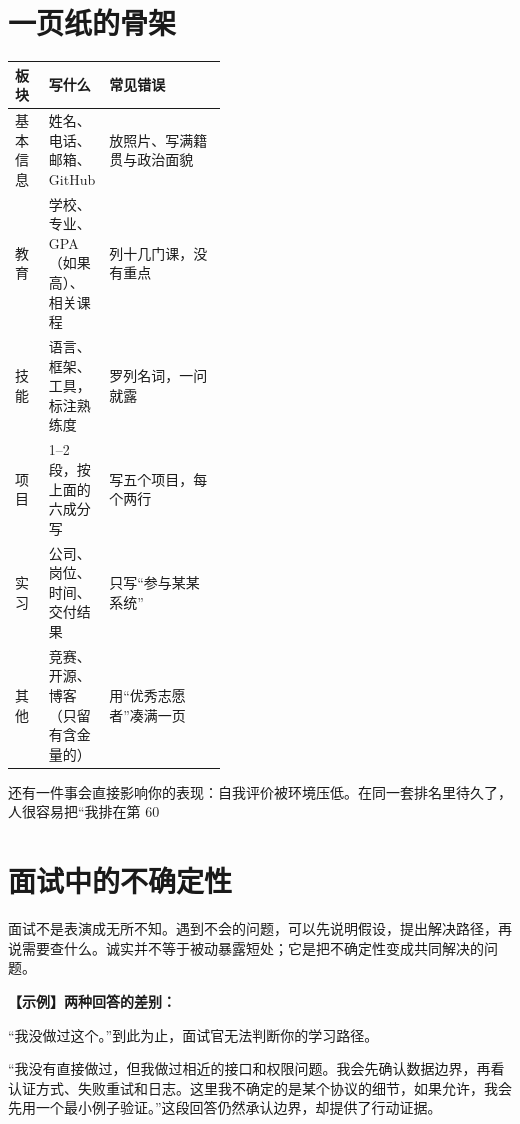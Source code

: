 \documentclass[UTF8,zihao=5,openany]{ctexbook}
\begin{document}
\section{一页纸的骨架}
\begin{center}\small
\begin{tabularx}{\linewidth}{p{0.16\linewidth}p{0.26\linewidth}Y}
\toprule
板块 & 写什么 & 常见错误 \\
\midrule
基本信息 & 姓名、电话、邮箱、GitHub & 放照片、写满籍贯与政治面貌 \\
教育 & 学校、专业、GPA（如果高）、相关课程 & 列十几门课，没有重点 \\
技能 & 语言、框架、工具，标注熟练度 & 罗列名词，一问就露 \\
项目 & 1--2 段，按上面的六成分写 & 写五个项目，每个两行 \\
实习 & 公司、岗位、时间、交付结果 & 只写“参与某某系统” \\
其他 & 竞赛、开源、博客（只留有含金量的） & 用“优秀志愿者”凑满一页 \\
\bottomrule
\end{tabularx}
\end{center}


还有一件事会直接影响你的表现：自我评价被环境压低。在同一套排名里待久了，人很容易把“我排在第 60%

\section{面试中的不确定性}
面试不是表演成无所不知。遇到不会的问题，可以先说明假设，提出解决路径，再说需要查什么。诚实并不等于被动暴露短处；它是把不确定性变成共同解决的问题。

\begin{casebox}
\textbf{【示例】两种回答的差别：}

“我没做过这个。”到此为止，面试官无法判断你的学习路径。

“我没有直接做过，但我做过相近的接口和权限问题。我会先确认数据边界，再看认证方式、失败重试和日志。这里我不确定的是某个协议的细节，如果允许，我会先用一个最小例子验证。”这段回答仍然承认边界，却提供了行动证据。
\end{casebox}
\end{document}
